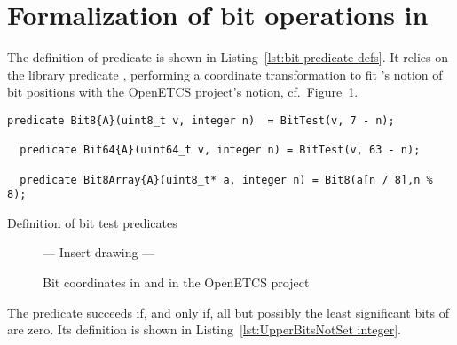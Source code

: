 \FloatBarrier

\section{Formalization of bit operations in \framac}
\label{sec:bit operations in framac}






The definition of predicate  is shown in 
Listing~\ref{lst:bit predicate defs}.
%
It relies on the \framac library predicate ,
performing a coordinate
transformation to fit \framac's notion of bit positions with the
OpenETCS project's
notion, cf.\ Figure~\ref{fig:bit coords}.





\begin{listing}[hbt]
\begin{minipage}{0.99\textwidth}
\begin{lstlisting}[style=acsl-block]
  predicate Bit8{A}(uint8_t v, integer n)  = BitTest(v, 7 - n);

  predicate Bit64{A}(uint64_t v, integer n) = BitTest(v, 63 - n);

  predicate Bit8Array{A}(uint8_t* a, integer n) = Bit8(a[n / 8],n % 8);
\end{lstlisting}
\end{minipage}
\caption{\label{lst:bit predicate defs}Definition of bit test predicates}
\end{listing}













\begin{figure}
\begin{center}
\vspace*{2cm}
--- Insert drawing --- 
\vspace*{2cm}
\caption{\label{fig:bit coords}
        Bit coordinates in \framac and in the OpenETCS project}
\end{center}
\end{figure}

\FloatBarrier






The predicate  succeeds if,
and only if,
all but possibly 
the least significant  bits of  are zero.
%
Its definition is shown in Listing~\ref{lst:UpperBitsNotSet integer}.







